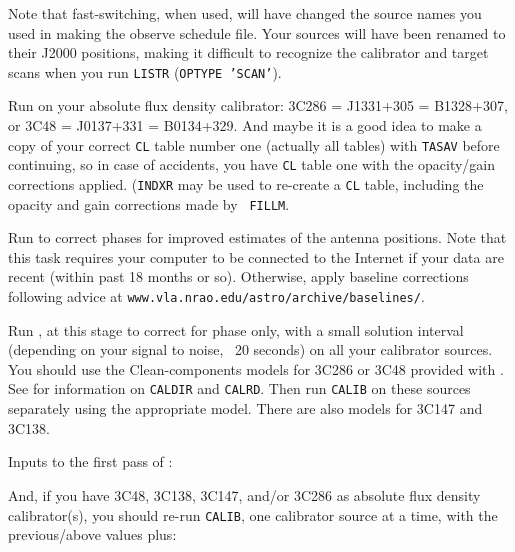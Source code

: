 Note that fast-switching, when used, will have changed the source
names you used in making the observe schedule file. Your sources will
have been renamed to their J2000 positions, making it difficult to
recognize the calibrator and target scans when you run {\tt LISTR}
({\tt OPTYPE 'SCAN'}).

Run {\tt {}} on your absolute flux density calibrator: 3C286
= J1331+305 = B1328+307, or 3C48 = J0137+331 = B0134+329. And maybe it
is a good idea to make a copy of your correct {\tt CL} table number
one (actually all tables) with {\tt TASAV} before continuing, so in
case of accidents, you have {\tt CL} table one with the opacity/gain
corrections applied.  ({\tt INDXR} may be used to re-create a {\tt CL}
table, including the opacity and gain corrections made by {\tt
FILLM}\@.

Run {\tt {}} to correct phases for improved estimates of the
antenna positions.  Note that this task requires your computer to be
connected to the Internet if your data are recent (within past 18
months or so).  Otherwise, apply baseline corrections following advice
at {\tt www.vla.nrao.edu/astro/archive/baselines/}.

Run {\tt {}}, at this stage to correct for phase only, with
a small solution interval (depending on your signal to noise, \eg\ 20
seconds) on all your calibrator sources. You should use the
Clean-components models for 3C286 or 3C48 provided with \AIPS\@.  See
 for information on {\tt CALDIR} and {\tt CALRD}\@.
Then run {\tt CALIB} on these sources separately using the appropriate
model.  There are also models for 3C147 and 3C138\@.

Inputs to the first pass of {\tt {}}:
\pd

And, if you have 3C48, 3C138, 3C147, and/or 3C286 as absolute flux
density calibrator(s), you should re-run {\tt CALIB}, one calibrator
source at a time, with the previous/above values plus:
\pd

